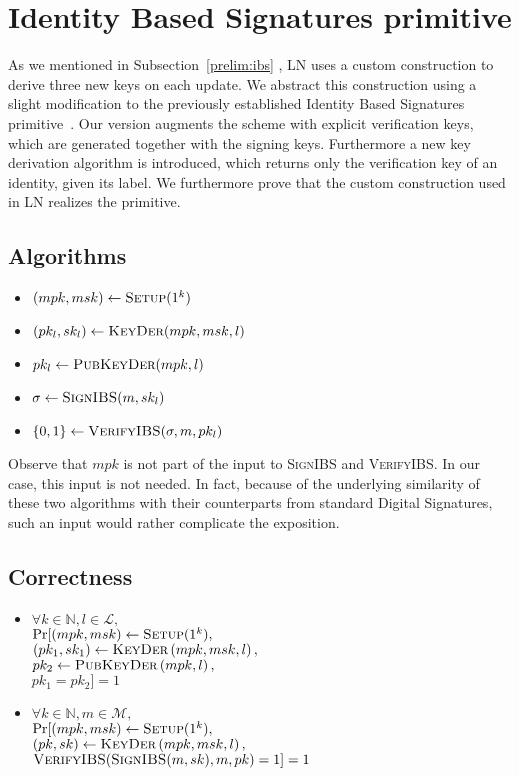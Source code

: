 \section{Identity Based Signatures primitive}
  As we mentioned in Subsection~\ref{prelim:ibs} , LN uses a custom construction to derive three new keys on each
  update. We abstract this construction using a slight modification to the
  previously established Identity Based Signatures
  primitive~\cite{ibspaterson,ibsshamir}. Our version augments the scheme with
  explicit verification keys, which are generated together with the signing
  keys. Furthermore a new key derivation algorithm is introduced, which returns
  only the verification key of an identity, given its label. We furthermore
  prove that the custom construction used in LN realizes the primitive.

  \subsection{Algorithms}
    \begin{itemize}
      \item $(mpk, msk) \leftarrow \textsc{Setup}(1^k)$
      \item $(pk_l, sk_l) \leftarrow \textsc{KeyDer}(mpk, msk, l)$
      \item $pk_l \leftarrow \textsc{PubKeyDer}(mpk, l)$
      \item $\sigma \leftarrow \textsc{SignIBS}(m, sk_l)$
      \item $\{0, 1\} \leftarrow \textsc{VerifyIBS}(\sigma, m, pk_l)$
    \end{itemize}
    Observe that $mpk$ is not part of the input to \textsc{SignIBS} and
    \textsc{VerifyIBS}. In our case, this input is not needed. In fact, because
    of the underlying similarity of these two algorithms with their
    counterparts from standard Digital Signatures, such an input would rather
    complicate the exposition.

  \subsection{Correctness}
    \begin{itemize}
      \item $\forall k \in \mathbb{N}, l \in \mathcal{L},$ \\
      $\Pr[(mpk, msk) \gets \textsc{Setup}(1^k),$ \\
      $(pk_1, sk_1) \gets \textsc{KeyDer}\left(mpk, msk, l\right),$ \\
      $pk_2 \gets \textsc{PubKeyDer}\left(mpk, l\right),$ \\
      $pk_1 = pk_2] = 1$

      \item $\forall k \in \mathbb{N}, m \in \mathcal{M},$ \\
      $\Pr[(mpk, msk) \gets \textsc{Setup}(1^k),$ \\
      $(pk, sk) \gets \textsc{KeyDer}\left(mpk, msk, l\right),$ \\
      $\textsc{VerifyIBS}(\textsc{SignIBS}(m, sk), m, pk) = 1] = 1$
    \end{itemize}

